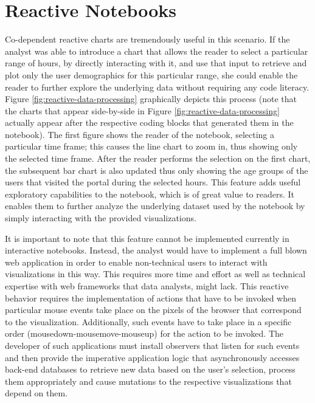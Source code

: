 
\section{Reactive Notebooks} 

 Co-dependent reactive charts are tremendously useful in this scenario. If the analyst was able to introduce a chart that allows the reader to select a particular range of hours, by directly interacting with it, and use that input to retrieve and plot only the user demographics for this particular range, she could enable the reader to further explore the underlying data without requiring any code literacy. Figure \ref{fig:reactive-data-processing} graphically depicts this process (note that the charts that appear side-by-side in Figure \ref{fig:reactive-data-processing} actually appear after the respective coding blocks that generated them in the notebook). The first figure shows the reader of the notebook, selecting a particular time frame; this causes the line chart to zoom in, thus showing only the selected time frame. After the reader performs the selection on the first chart, the subsequent bar chart is also updated thus only showing the age groups of the users that visited the portal during the selected hours. This feature adds useful exploratory capabilities to the notebook, which is of great value to readers. It enables them to further analyze the underlying dataset used by the notebook by simply interacting with the provided visualizations. 


 It is important to note that this feature cannot be implemented currently in interactive notebooks. Instead, the analyst would have to implement a full blown web application in order to enable non-technical users to interact with visualizations in this way. This requires more time and effort as well as technical expertise with web frameworks that data analysts, might lack. This reactive behavior requires the implementation of actions that have to be invoked when particular mouse events take place on the pixels of the browser that correspond to the visualization. Additionally, such events have to take place in a specific order (mousedown-mousemove-mouseup) for the action to be invoked. The developer of such applications must install observers that listen for such events and then provide the imperative application logic that asynchronously accesses back-end databases to retrieve new data based on the user's selection, process them appropriately and cause mutations to the respective visualizations that depend on them. 


